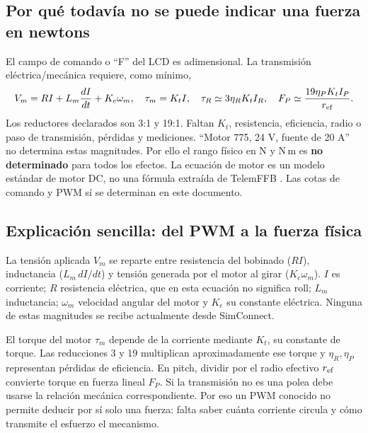 \documentclass[11pt,a4paper]{article}
\begin{document}
\subsection{Por qué todavía no se puede indicar una fuerza en newtons}
El campo de comando o ``F'' del LCD es adimensional. La transmisión eléctrica/mecánica requiere, como mínimo,
\begin{equation}
 V_m=RI+L_m\frac{dI}{dt}+K_e\omega_m,\quad \tau_m=K_t I,\quad
 \tau_R\simeq3\eta_RK_tI_R,\quad F_P\simeq\frac{19\eta_PK_tI_P}{r_{\rm ef}}.
\end{equation}
Los reductores declarados son 3:1 y 19:1. Faltan $K_t$, resistencia, eficiencia, radio o paso de transmisión, pérdidas y mediciones. ``Motor 775, 24 V, fuente de 20 A'' no determina estas magnitudes. Por ello el rango físico en N y N\,m es \textbf{no determinado} para todos los efectos. La ecuación de motor es un modelo estándar de motor DC, no una fórmula extraída de TelemFFB \cite{motor}. Las cotas de comando y PWM sí se determinan en este documento.


\subsection{Explicación sencilla: del PWM a la fuerza física}
La tensión aplicada $V_m$ se reparte entre resistencia del bobinado ($RI$), inductancia ($L_m\,dI/dt$) y tensión generada por el motor al girar ($K_e\omega_m$). $I$ es corriente; $R$ resistencia eléctrica, que en esta ecuación no significa roll; $L_m$ inductancia; $\omega_m$ velocidad angular del motor y $K_e$ su constante eléctrica. Ninguna de estas magnitudes se recibe actualmente desde SimConnect.

El torque del motor $\tau_m$ depende de la corriente mediante $K_t$, su constante de torque. Las reducciones 3 y 19 multiplican aproximadamente ese torque y $\eta_R,\eta_P$ representan pérdidas de eficiencia. En pitch, dividir por el radio efectivo $r_{\rm ef}$ convierte torque en fuerza lineal $F_P$. Si la transmisión no es una polea debe usarse la relación mecánica correspondiente. Por eso un PWM conocido no permite deducir por sí solo una fuerza: falta saber cuánta corriente circula y cómo transmite el esfuerzo el mecanismo.
\end{document}
